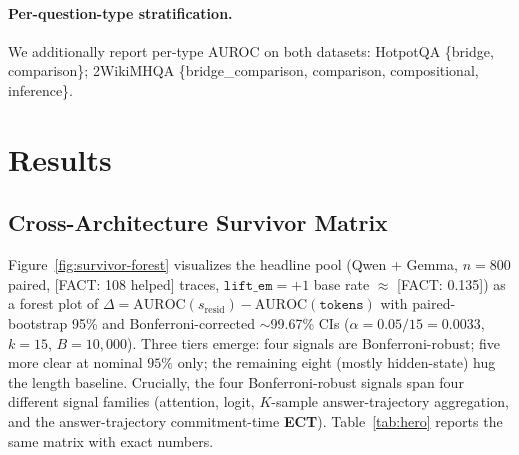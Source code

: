 \documentclass[11pt]{article}
\newcommand{\FACT}[1]{{\color{blue}\textsf{[FACT: #1]}}}
\begin{document}
\paragraph{Per-question-type stratification.} We additionally report per-type
AUROC on both datasets: HotpotQA \{bridge, comparison\}; 2WikiMHQA
\{bridge\_comparison, comparison, compositional, inference\}.


\section{Results}
\label{sec:results}

\subsection{Cross-Architecture Survivor Matrix}
\label{sec:results-matrix}

Figure~\ref{fig:survivor-forest} visualizes the headline pool
(Qwen + Gemma, $n{=}800$ paired, \FACT{108 helped} traces,
$\texttt{lift\_em}{=}+1$ base rate $\approx$ \FACT{0.135}) as a forest plot
of $\Delta = \mathrm{AUROC}(s_{\text{resid}}) - \mathrm{AUROC}(\texttt{tokens})$
with paired-bootstrap 95\% and Bonferroni-corrected $\sim$99.67\% CIs
($\alpha = 0.05/15 = 0.0033$, $k{=}15$, $B{=}10{,}000$). Three tiers emerge:
four signals are Bonferroni-robust; five more clear at nominal $95\%$ only;
the remaining eight (mostly hidden-state) hug the length baseline.
Crucially, the four Bonferroni-robust signals span four different signal
families (attention, logit, $K$-sample answer-trajectory aggregation, and
the answer-trajectory commitment-time \textbf{ECT}). Table~\ref{tab:hero}
reports the same matrix with exact numbers.
\end{document}
